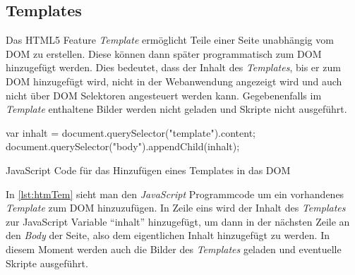 \documentclass[12pt, paper=a4, bibtotoc, toc=listof, headsepline=true]{scrreprt}
\begin{document}
		\subsection{Templates}
		\label{subsec:Templates}
		Das \ac{HTML5} Feature \emph{Template} ermöglicht Teile einer Seite unabhängig vom \ac{DOM} zu erstellen. Diese können dann später programmatisch zum \ac{DOM} hinzugefügt werden.\cite[vgl. S.177]{Cameron2015} Dies bedeutet, dass der Inhalt des \emph{Templates}, bis er zum \ac{DOM} hinzugefügt wird, nicht in der Webanwendung angezeigt wird und auch nicht über \ac{DOM} Selektoren angesteuert werden kann. Gegebenenfalls im \emph{Template} enthaltene Bilder werden nicht geladen und Skripte nicht ausgeführt.\cite[vgl.]{Potschien2013} 
		\begin{listing}
			\begin{JavaScriptcode*}{}
var inhalt = document.querySelector("template").content;
document.querySelector("body").appendChild(inhalt);
			\end{JavaScriptcode*}
			\caption{JavaScript Code für das Hinzufügen eines Templates in das DOM}
			\label{lst:htmTem}
		\end{listing}
		In \ref{lst:htmTem} sieht man den \emph{JavaScript} Programmcode um ein vorhandenes \emph{Template} zum \ac{DOM} hinzuzufügen. In Zeile eins wird der Inhalt des \emph{Templates} zur JavaScript Variable \enquote{inhalt} hinzugefügt, um dann in der nächsten Zeile an den \emph{Body} der Seite, also dem eigentlichen Inhalt hinzugefügt zu werden. In diesem Moment werden auch die Bilder des \emph{Templates} geladen und eventuelle Skripte ausgeführt.
\end{document}

